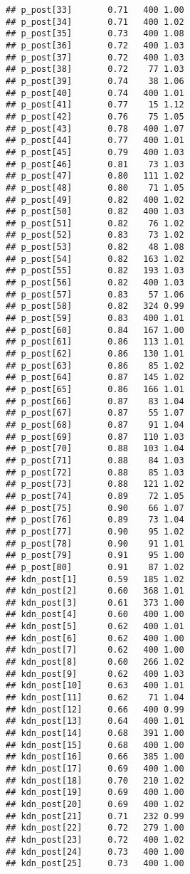 \documentclass{article}\usepackage[]{graphicx}\usepackage[]{color}
\makeatletter
\newenvironment{kframe}{%
 \def\at@end@of@kframe{}%
 \ifinner\ifhmode%
  \def\at@end@of@kframe{\end{minipage}}%
  \begin{minipage}{\columnwidth}%
 \fi\fi%
 \def\FrameCommand##1{\hskip\@totalleftmargin \hskip-\fboxsep
 \colorbox{shadecolor}{##1}\hskip-\fboxsep
     \hskip-\linewidth \hskip-\@totalleftmargin \hskip\columnwidth}%
 \MakeFramed {\advance\hsize-\width
   \@totalleftmargin\z@ \linewidth\hsize
   \@setminipage}}%
 {\par\unskip\endMakeFramed%
 \at@end@of@kframe}
\newenvironment{knitrout}{}{} %
\makeatother
\begin{document}
\begin{knitrout}
\begin{kframe}
\begin{verbatim}
## p_post[33]       0.71   400 1.00
## p_post[34]       0.71   400 1.02
## p_post[35]       0.73   400 1.08
## p_post[36]       0.72   400 1.03
## p_post[37]       0.72   400 1.03
## p_post[38]       0.72    77 1.03
## p_post[39]       0.74    38 1.06
## p_post[40]       0.74   400 1.01
## p_post[41]       0.77    15 1.12
## p_post[42]       0.76    75 1.05
## p_post[43]       0.78   400 1.07
## p_post[44]       0.77   400 1.01
## p_post[45]       0.79   400 1.03
## p_post[46]       0.81    73 1.03
## p_post[47]       0.80   111 1.02
## p_post[48]       0.80    71 1.05
## p_post[49]       0.82   400 1.02
## p_post[50]       0.82   400 1.03
## p_post[51]       0.82    76 1.02
## p_post[52]       0.83    73 1.02
## p_post[53]       0.82    48 1.08
## p_post[54]       0.82   163 1.02
## p_post[55]       0.82   193 1.03
## p_post[56]       0.82   400 1.03
## p_post[57]       0.83    57 1.06
## p_post[58]       0.82   324 0.99
## p_post[59]       0.83   400 1.01
## p_post[60]       0.84   167 1.00
## p_post[61]       0.86   113 1.01
## p_post[62]       0.86   130 1.01
## p_post[63]       0.86    85 1.02
## p_post[64]       0.87   145 1.02
## p_post[65]       0.86   166 1.01
## p_post[66]       0.87    83 1.04
## p_post[67]       0.87    55 1.07
## p_post[68]       0.87    91 1.04
## p_post[69]       0.87   110 1.03
## p_post[70]       0.88   103 1.04
## p_post[71]       0.88    84 1.03
## p_post[72]       0.88    85 1.03
## p_post[73]       0.88   121 1.02
## p_post[74]       0.89    72 1.05
## p_post[75]       0.90    66 1.07
## p_post[76]       0.89    73 1.04
## p_post[77]       0.90    95 1.02
## p_post[78]       0.90    91 1.01
## p_post[79]       0.91    95 1.00
## p_post[80]       0.91    87 1.02
## kdn_post[1]      0.59   185 1.02
## kdn_post[2]      0.60   368 1.01
## kdn_post[3]      0.61   373 1.00
## kdn_post[4]      0.60   400 1.00
## kdn_post[5]      0.62   400 1.01
## kdn_post[6]      0.62   400 1.00
## kdn_post[7]      0.62   400 1.00
## kdn_post[8]      0.60   266 1.02
## kdn_post[9]      0.62   400 1.03
## kdn_post[10]     0.63   400 1.01
## kdn_post[11]     0.62    71 1.04
## kdn_post[12]     0.66   400 0.99
## kdn_post[13]     0.64   400 1.01
## kdn_post[14]     0.68   391 1.00
## kdn_post[15]     0.68   400 1.00
## kdn_post[16]     0.66   385 1.00
## kdn_post[17]     0.69   400 1.00
## kdn_post[18]     0.70   210 1.02
## kdn_post[19]     0.69   400 1.00
## kdn_post[20]     0.69   400 1.02
## kdn_post[21]     0.71   232 0.99
## kdn_post[22]     0.72   279 1.00
## kdn_post[23]     0.72   400 1.02
## kdn_post[24]     0.73   400 1.00
## kdn_post[25]     0.73   400 1.00

\end{verbatim}
\end{kframe}
\end{knitrout}
\end{document}
